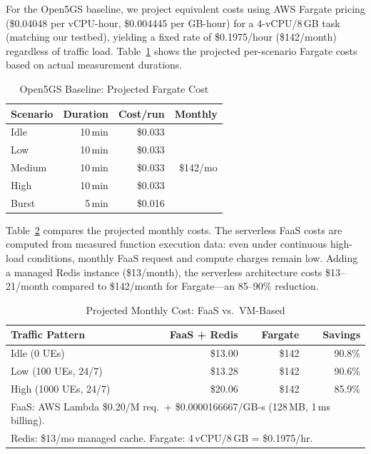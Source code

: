 \documentclass[conference]{IEEEtran}
\begin{document}
For the Open5GS baseline, we project equivalent costs using AWS Fargate pricing (\$0.04048 per vCPU-hour, \$0.004445 per GB-hour) for a 4-vCPU/8\,GB task (matching our testbed), yielding a fixed rate of \$0.1975/hour (\$142/month) regardless of traffic load. Table~\ref{tab:open5gs-cost} shows the projected per-scenario Fargate costs based on actual measurement durations.

\begin{table}[t]
\centering
\caption{Open5GS Baseline: Projected Fargate Cost}
\label{tab:open5gs-cost}
\footnotesize
\begin{tabular}{@{}lrrr@{}}
\toprule
\textbf{Scenario} & \textbf{Duration} & \textbf{Cost/run} & \textbf{Monthly} \\
\midrule
Idle      & 10\,min & \$0.033 & \multirow{5}{*}{\$142/mo} \\
Low       & 10\,min & \$0.033 & \\
Medium    & 10\,min & \$0.033 & \\
High      & 10\,min & \$0.033 & \\
Burst     & 5\,min  & \$0.016 & \\
\bottomrule
\end{tabular}
\end{table}

Table~\ref{tab:cost} compares the projected monthly costs. The serverless FaaS costs are computed from measured function execution data: even under continuous high-load conditions, monthly FaaS request and compute charges remain low. Adding a managed Redis instance (\$13/month), the serverless architecture costs \$13--21/month compared to \$142/month for Fargate---an 85--90\% reduction.

\begin{table}[t]
\centering
\caption{Projected Monthly Cost: FaaS vs.\ VM-Based}
\label{tab:cost}
\footnotesize
\begin{tabular}{@{}lrrr@{}}
\toprule
\textbf{Traffic Pattern} & \textbf{FaaS + Redis} & \textbf{Fargate} & \textbf{Savings} \\
\midrule
Idle (0 UEs)              & \$13.00  & \$142  & 90.8\% \\
Low (100 UEs, 24/7)       & \$13.28  & \$142  & 90.6\% \\
High (1000 UEs, 24/7)     & \$20.06  & \$142  & 85.9\% \\
\bottomrule
\multicolumn{4}{l}{\scriptsize FaaS: AWS Lambda \$0.20/M req.\ + \$0.0000166667/GB-s (128\,MB, 1\,ms billing).} \\
\multicolumn{4}{l}{\scriptsize Redis: \$13/mo managed cache. Fargate: 4\,vCPU/8\,GB = \$0.1975/hr.}
\end{tabular}
\end{table}
\end{document}
